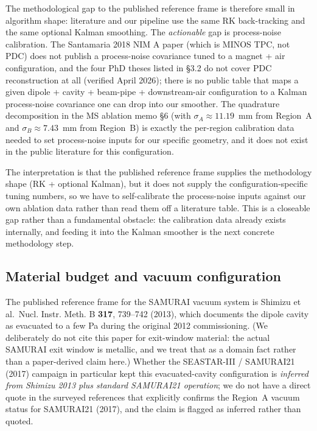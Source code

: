 \documentclass[a4paper, 11pt]{article}
\begin{document}
The methodological gap to the published reference frame is therefore small in algorithm shape: literature and our pipeline use the same RK back-tracking and the same optional Kalman smoothing. The \emph{actionable} gap is process-noise calibration. The Santamaria 2018 NIM A paper (which is MINOS TPC, not PDC) does not publish a process-noise covariance tuned to a magnet + air configuration, and the four PhD theses listed in §3.2 do not cover PDC reconstruction at all (verified April 2026); there is no public table that maps a given dipole + cavity + beam-pipe + downstream-air configuration to a Kalman process-noise covariance one can drop into our smoother. The quadrature decomposition in the MS ablation memo §6 (with $\sigma_A \approx 11.19$~mm from Region~A and $\sigma_B \approx 7.43$~mm from Region~B) is exactly the per-region calibration data needed to set process-noise inputs for our specific geometry, and it does not exist in the public literature for this configuration.

The interpretation is that the published reference frame supplies the methodology shape (RK + optional Kalman), but it does not supply the configuration-specific tuning numbers, so we have to self-calibrate the process-noise inputs against our own ablation data rather than read them off a literature table. This is a closeable gap rather than a fundamental obstacle: the calibration data already exists internally, and feeding it into the Kalman smoother is the next concrete methodology step.
\subsection{Material budget and vacuum configuration}
The published reference frame for the SAMURAI vacuum system is Shimizu et al.\ Nucl. Instr. Meth. B \textbf{317}, 739--742 (2013), which documents the dipole cavity as evacuated to a few Pa during the original 2012 commissioning. (We deliberately do not cite this paper for exit-window material: the actual SAMURAI exit window is metallic, and we treat that as a domain fact rather than a paper-derived claim here.) Whether the SEASTAR-III / SAMURAI21 (2017) campaign in particular kept this evacuated-cavity configuration is \emph{inferred from Shimizu 2013 plus standard SAMURAI21 operation}; we do not have a direct quote in the surveyed references that explicitly confirms the Region~A vacuum status for SAMURAI21 (2017), and the claim is flagged as inferred rather than quoted.
\end{document}
